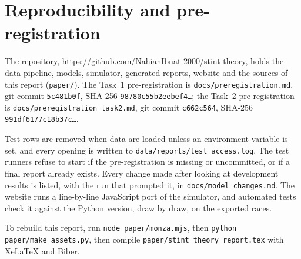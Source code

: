 \documentclass[12pt]{article}
\begin{document}
\newpage
\printbibliography[heading=bibintoc,title={References}]

\newpage
\appendix
\section{Reproducibility and pre-registration}\label{app:repro}

{\raggedright

The repository, \url{https://github.com/NahianIbnat-2000/stint-theory}, holds the data pipeline, models, simulator,
generated reports, website and the sources of this report (\texttt{paper/}). The Task~1 pre-registration is
\texttt{docs/preregistration.md}, git commit \texttt{5c481b0f}, SHA-256 \texttt{98780c55b2eebef4\ldots}; the Task~2
pre-registration is \texttt{docs/preregistration\_task2.md}, git commit \texttt{c662c564}, SHA-256
\texttt{991df6177c18b37c\ldots}.

Test rows are removed when data are loaded unless an environment variable is set, and every opening is written to
\texttt{data/reports/test\_access.log}. The test runners refuse to start if the pre-registration is missing or
uncommitted, or if a final report already exists. Every change made after looking at development results is listed,
with the run that prompted it, in \texttt{docs/model\_changes.md}. The website runs a line-by-line JavaScript port of the
simulator, and automated tests check it against the Python version, draw by draw, on the exported races.

To rebuild this report, run \texttt{node paper/monza.mjs}, then \texttt{python paper/make\_assets.py}, then compile
\texttt{paper/stint\_theory\_report.tex} with XeLaTeX and Biber.
\par}
\end{document}

